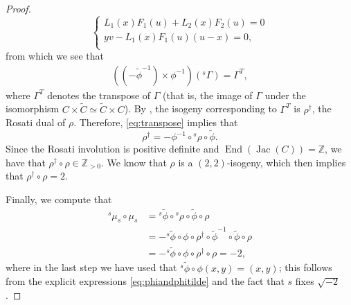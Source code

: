 \documentclass[oneside]{amsart}
\theoremstyle{remark}
\newcommand{\Z}{\mathbb Z}
\newcommand{\End}{\operatorname{End}}
\newcommand{\Jac}{\operatorname{Jac}}
\numberwithin{equation}{section}
\begin{document}
\begin{proof}
\begin{equation}
\begin{cases}
    L_1(x)F_1(u) + L_2(x)F_2(u) = 0\\
    y v - L_1(x)F_1(u) (u-x)=0,\\
    \end{cases}
  \end{equation}
  from which we see that
  \begin{align}
    \label{eq:transpose}
  ((-\tilde\phi^{-1})\times \phi^{-1})({{}^{s}\Gamma})= \Gamma^T,  
  \end{align}
where $\Gamma^T$ denotes the transpose of $\Gamma$ (that is, the image of $\Gamma$ under the isomorphism $C\times \tilde C\simeq\tilde C\times C$). By \cite[Proposition 3.3.16]{Smi05}, the isogeny corresponding to $\Gamma^T$ is $\rho^\dagger$, the Rosati dual of $\rho$. Therefore, \eqref{eq:transpose} implies that
\[
  \rho^\dagger = -\phi^{-1} \circ {{}^{s}\rho}\circ \tilde\phi.
\]
Since the Rosati involution is positive definite and $\End(\Jac(C))=\Z$, we have that $\rho^\dagger \circ\rho \in \Z_{>0}$. We know that $\rho$ is a $(2,2)$-isogeny, which then implies that $\rho^\dagger\circ\rho=2$.

Finally, we compute that
\begin{align*}
  {{}^{s} \mu_{s} }\circ \mu_{s}  &= {{}^{s}\tilde\phi }\circ {{}^{s}\rho} \circ   \tilde \phi\circ \rho  \\
& =- {{}^{s}\tilde\phi } \circ\phi\circ\rho^\dagger\circ\tilde\phi^{-1}\circ    \tilde \phi\circ \rho \\
  &=-{{}^{s}\tilde\phi } \circ\phi\circ\rho^\dagger\circ   \rho =-2,
\end{align*}
where in the last step we have used that  ${{}^{s}\tilde\phi } \circ\phi (x,y)=(x,y)$; this follows from the explicit expressions \eqref{eq:phiandphitilde} and the fact that ${s}$ fixes $\sqrt{-2}$.
\end{proof}
\end{document}
